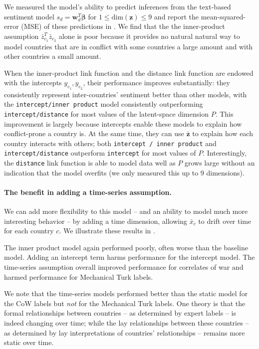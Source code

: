 We measured the model's ability to predict inferences from the
text-based sentiment model $s_d = \bm w_d^T \bm \beta$ for $1 \le
\mbox{dim}(\bm z) \le 9$ and report the mean-squared-error (MSE) of
these predictions in .  We find that
the the inner-product assumption $\bar z_{c_1}^T \bar z_{c_2}$ alone
is poor because it provides no natural natural way to model countries that are
in conflict with some countries a large amount and with other
countries a small amount.

When the inner-product link function and the distance link function
are endowed with the intercepts $y_{c_1}, y_{c_2}$, their performance
improves substantially: they consistently represent inter-countries'
sentiment better than other models, with the
\verb!intercept/inner product!  model consistently outperforming
\verb!intercept/distance! for most values of the latent-space
dimension $P$. This improvement is largely because intercepts enable
these models to explain how conflict-prone a country is. At the same
time, they can use $\bm \bar z$ to explain how each country interacts
with others; both \verb!intercept / inner product! and
\verb!intercept/distance! outperform \verb!intercept! for most
values of $P$.  Interestingly, the \verb!distance! link function is
able to model data well as $P$ grows large without an indication that
the model overfits (we only measured this up to 9 dimensions).

\paragraph{The benefit in adding a time-series assumption.}
We can add more flexibility to this model -- and an ability to model
much more interesting behavior -- by adding a time dimension, allowing
$\bar x_c$ to drift over time for each country $c$.  We illustrate
these results in .

The inner product model again performed poorly, often worse than the
baseline model.  Adding an intercept term harms performance for the
intercept model.  The time-series assumption overall improved
performance for correlates of war and harmed performance for
Mechanical Turk labels.

We note that the time-series models performed better than the static
model for the CoW labels but \emph{not} for the Mechanical Turk
labels.  One theory is that the formal relationships between countries
-- as determined by expert labels -- is indeed changing over time;
while the lay relationships between these countries -- as determined
by lay interpretations of countries' relationships -- remains more
static over time.

